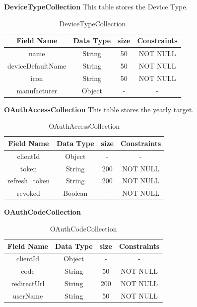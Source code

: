 \textbf{DeviceTypeCollection} This table stores the Device Type.\nolinebreak
\begin{table}[hp]
\centering
\begin{tabular}{|c|c|c|c|}
\hline
\textbf{Field Name}  & \textbf{Data Type}  & \textbf{size} &\textbf{Constraints}  \\
\hline
name &	String &	50 & NOT NULL \\\hline
deviceDefaultName &	String &	50 & NOT NULL \\\hline
icon &	String &	50 & NOT NULL \\\hline
manufacturer &	Object &	- &- \\\hline


 
\end{tabular}
\caption{DeviceTypeCollection}
\end{table}

\pagebreak

\textbf{OAuthAccessCollection} This table stores the  yearly target.\nolinebreak
\begin{table}[hp]
\centering
\begin{tabular}{|c|c|c|c|}
\hline
\textbf{Field Name}  & \textbf{Data Type}  & \textbf{size} &\textbf{Constraints}  \\
\hline
clientId &	  Object &-	 & - \\\hline
token &	String &	200 & NOT NULL \\\hline
refresh\_token &	String &	200 & NOT NULL \\\hline
revoked &	Boolean &	- & NOT NULL \\\hline

 
\end{tabular}
\caption{OAuthAccessCollection}
\end{table}


\textbf{OAuthCodeCollection} \nolinebreak
\begin{table}[hp]
\centering
\begin{tabular}{|c|c|c|c|}
\hline
\textbf{Field Name}  & \textbf{Data Type}  & \textbf{size} &\textbf{Constraints}  \\
\hline
clientId &	Object &	- & -\\\hline
code &	String &	50 & NOT NULL \\\hline
redirectUrl &	String &	200 & NOT NULL \\\hline
userName &	String &	50 & NOT NULL \\\hline
 
\end{tabular}
\caption{OAuthCodeCollection}
\end{table}

